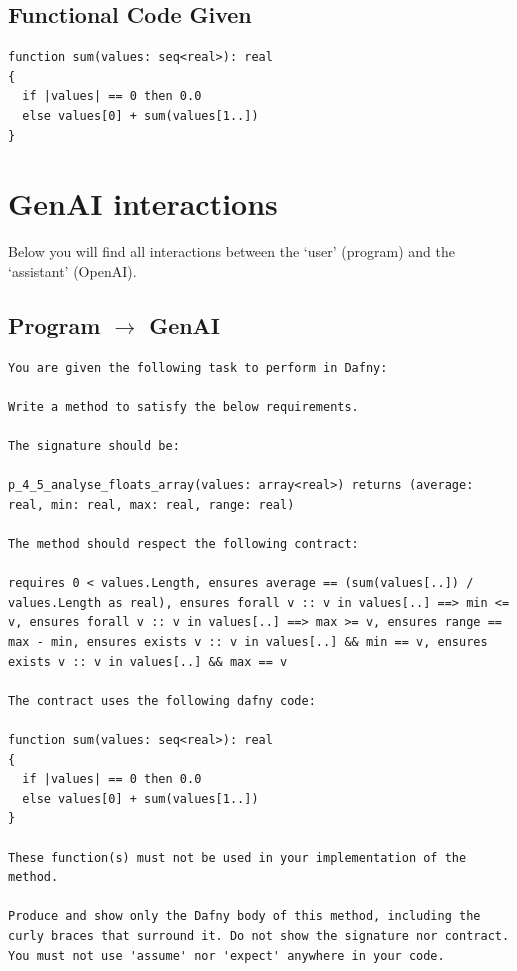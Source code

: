 \documentclass{article}
\begin{document}
\subsection*{Functional Code Given}
\begin{lstlisting}
function sum(values: seq<real>): real
{
  if |values| == 0 then 0.0
  else values[0] + sum(values[1..])
}
\end{lstlisting}
\clearpage
\section*{GenAI interactions}
Below you will find all interactions between the `user' (program) and the `assistant' (OpenAI).
\subsection*{Program $\rightarrow$ GenAI}
\begin{lstlisting}
You are given the following task to perform in Dafny:

Write a method to satisfy the below requirements.

The signature should be:

p_4_5_analyse_floats_array(values: array<real>) returns (average: real, min: real, max: real, range: real)

The method should respect the following contract:

requires 0 < values.Length, ensures average == (sum(values[..]) / values.Length as real), ensures forall v :: v in values[..] ==> min <= v, ensures forall v :: v in values[..] ==> max >= v, ensures range == max - min, ensures exists v :: v in values[..] && min == v, ensures exists v :: v in values[..] && max == v

The contract uses the following dafny code:

function sum(values: seq<real>): real
{
  if |values| == 0 then 0.0
  else values[0] + sum(values[1..])
}

These function(s) must not be used in your implementation of the method.

Produce and show only the Dafny body of this method, including the curly braces that surround it. Do not show the signature nor contract. You must not use 'assume' nor 'expect' anywhere in your code.
\end{lstlisting}
\end{document}
